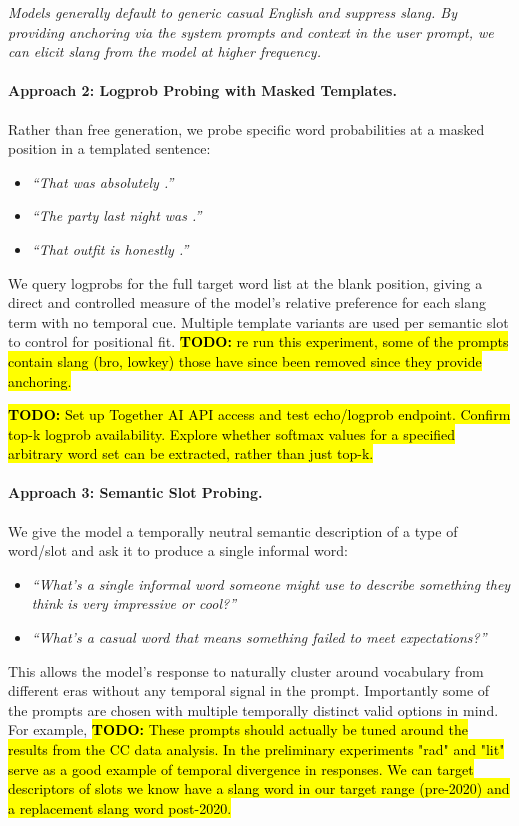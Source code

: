 \documentclass[11pt]{article}
\newcommand{\todo}[1]{\hl{\textbf{TODO:} #1}}
\begin{document}
\noindent\textit{Models generally default to generic casual English and suppress slang. By providing anchoring via the system prompts and context in the user prompt, we can elicit slang from the model at higher frequency.}

\paragraph{Approach 2: Logprob Probing with Masked Templates.}
Rather than free generation, we probe specific word probabilities at a masked position in a templated sentence:
\begin{itemize}
  \item \textit{``That was absolutely \underline{\hspace{1cm}}.''}
  \item \textit{``The party last night was \underline{\hspace{1cm}}.''}
  \item \textit{``That outfit is honestly \underline{\hspace{1cm}}.''}
\end{itemize}
We query logprobs for the full target word list at the blank position, giving a direct and controlled measure of the model's relative preference for each slang term with no temporal cue. Multiple template variants are used per semantic slot to control for positional fit.
\todo{re run this experiment, some of the prompts contain slang (bro, lowkey) those have since been removed since they provide anchoring.}

\todo{Set up Together AI API access and test echo/logprob endpoint.
Confirm top-k logprob availability. Explore whether softmax values for a specified arbitrary word set can be extracted, rather than just top-k.}

\paragraph{Approach 3: Semantic Slot Probing.}
We give the model a temporally neutral semantic description of a type of word/slot and ask it to produce a single informal word:
\begin{itemize}
  \item \textit{``What's a single informal word someone might use to describe something they think is very impressive or cool?''}
  \item \textit{``What's a casual word that means something failed to meet expectations?''}
\end{itemize}
This allows the model's response to naturally cluster around vocabulary from different eras without any temporal signal in the prompt. Importantly some of the prompts are chosen with multiple temporally distinct valid options in mind. For example, \todo{These prompts should actually be tuned around the results from the CC data analysis. In the preliminary experiments "rad" and "lit" serve as a good example of temporal divergence in responses. We can target descriptors of slots we know have a slang word in our target range (pre-2020) and a replacement slang word post-2020.}
\end{document}
